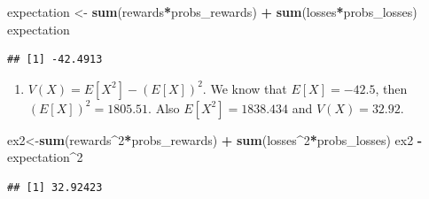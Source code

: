 \documentclass[]{book}
\newenvironment{Shaded}{\begin{snugshade}}{\end{snugshade}}
\newcommand{\DecValTok}[1]{\textcolor[rgb]{0.00,0.00,0.81}{#1}}
\newcommand{\KeywordTok}[1]{\textcolor[rgb]{0.13,0.29,0.53}{\textbf{#1}}}
\newcommand{\NormalTok}[1]{#1}
\newcommand{\OperatorTok}[1]{\textcolor[rgb]{0.81,0.36,0.00}{\textbf{#1}}}
\newcommand{\StringTok}[1]{\textcolor[rgb]{0.31,0.60,0.02}{#1}}
\providecommand{\tightlist}{%
  \setlength{\itemsep}{0pt}\setlength{\parskip}{0pt}}
\theoremstyle{definition}
\theoremstyle{definition}
\theoremstyle{definition}
\theoremstyle{remark}
\begin{document}
\begin{enumerate}
\begin{Shaded}
\begin{Highlighting}[]
\NormalTok{expectation <-}\StringTok{ }\KeywordTok{sum}\NormalTok{(rewards}\OperatorTok{*}\NormalTok{probs_rewards) }\OperatorTok{+}\StringTok{ }\KeywordTok{sum}\NormalTok{(losses}\OperatorTok{*}\NormalTok{probs_losses)}
\NormalTok{expectation}
\end{Highlighting}
\end{Shaded}

\begin{verbatim}
## [1] -42.4913
\end{verbatim}

  \begin{enumerate}
  \def\labelenumii{\alph{enumii})}
  \setcounter{enumii}{2}
  \tightlist
  \item
    \(V(X) = E[X^2] - (E[X])^2\). We know that \(E[X] = -42.5\), then
    \((E[X])^2 = 1805.51\). Also \(E[X^2] = 1838.434\) and
    \(V(X) = 32.92\).
  \end{enumerate}

\begin{Shaded}
\begin{Highlighting}[]
\NormalTok{ex2<-}\KeywordTok{sum}\NormalTok{(rewards}\OperatorTok{^}\DecValTok{2}\OperatorTok{*}\NormalTok{probs_rewards) }\OperatorTok{+}\StringTok{ }\KeywordTok{sum}\NormalTok{(losses}\OperatorTok{^}\DecValTok{2}\OperatorTok{*}\NormalTok{probs_losses)}
\NormalTok{ex2 }\OperatorTok{-}\StringTok{ }\NormalTok{expectation}\OperatorTok{^}\DecValTok{2}
\end{Highlighting}
\end{Shaded}

\begin{verbatim}
## [1] 32.92423
\end{verbatim}
\end{enumerate}


\end{document}

